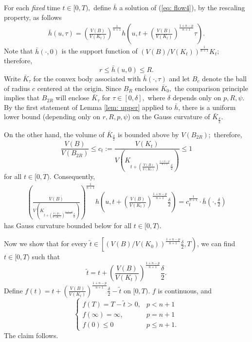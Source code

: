 \documentclass{amsart}
\theoremstyle{definition}
\theoremstyle{remark}
\numberwithin{equation}{section}
\begin{document}
For each \emph{fixed} time $t\in[0,T),$ define $\bar{h}$ a solution of (\ref{eq: flow4}), by the rescaling property, as follows
\begin{align*}
\bar{h}(u,\tau)=\left(\frac{V(B)}{V(K_t)}\right)^{\frac{1}{n+1}}h\left(u,
t+\left(\frac{V(B)}{V(K_t)}\right)^{\frac{1+n-p}{n+1}}\tau\right).
\end{align*}
Note that $\bar{h}(\cdot,0)$ is the support function of $\left(V(B)/V(K_t)\right)^{\frac{1}{n+1}}K_t$; therefore,
\[r\leq \bar{h}(u,0)\leq R.\]
Write $\bar{K}_{\tau}$ for the convex body associated with $\bar{h}(\cdot,\tau)$ and let $B_c$ denote the ball of radius $c$ centered at the origin. Since $B_{R}$ encloses
$\bar{K}_0,$ the comparison principle implies that $B_{2R}$
will enclose $\bar{K}_{\tau}$ for $\tau\in[0,\delta],$
where $\delta$ depends only on $p,R,\psi$. By the first statement of Lemma \ref{lem: upper} applied to $\bar{h}$, there is a uniform lower bound (depending only on $r,R,p,\psi$) on the Gauss curvature of $\bar{K}_{\frac{\delta}{2}}.$

On the other hand, the volume of $\bar{K}_{\frac{\delta}{2}}$ is bounded above by $V(B_{2R});$ therefore,
\[\displaystyle\frac{V(B)}{V(B_{2R})}\leq c_t:=\frac{V(K_t)}{V\left(K_{t+\left(\frac{V(B)}{V(K_t)}\right)^{\frac{1+n-p}{n+1}}\frac{\delta}{2}}\right)}\leq 1\]
for all $t\in [0,T)$. Consequently,
\begin{align*}
\left(\frac{V(B)}{V\left(K_{t+\left(\frac{V(B)}{V(K_t)}\right)^{\frac{1+n-p}{n+1}}\frac{\delta}{2}}\right)}\right)^{\frac{1}{n+1}}h\left(u,
t+\left(\frac{V(B)}{V(K_t)}\right)^{\frac{1+n-p}{n+1}}\frac{\delta}{2}\right)
=c_t^{\frac{1}{n+1}}\cdot\bar{h}(\cdot,\frac{\delta}{2})
\end{align*}
has Gauss curvature bounded below for all $t\in [0,T)$.

Now we show that for every
 $\tilde{t}\in\left[\left(V(B)/V(K_0)\right)^{\frac{1+n-p}{n+1}}\frac{\delta}{2},T\right)$, we can find $t\in[0,T)$ such that
\[\tilde{t}=t+\left(\frac{V(B)}{V(K_t)}\right)^{\frac{1+n-p}{n+1}}\frac{\delta}{2}.\]
Define $f(t)=t+\left(\frac{V(B)}{V(K_t)}\right)^{\frac{1+n-p}{n+1}}\frac{\delta}{2}-\tilde{t}$ on $[0,T)$.
$f$ is continuous, and
\[\left\{
    \begin{array}{ll}
      f(T)=T-\tilde{t}>0, & p<n+1 \\
      f(\infty)=\infty, & p= n+1 \\
      f(0)\leq 0& p\leq  n+1 .
    \end{array}
  \right.
\]
The claim follows.
\end{document}
